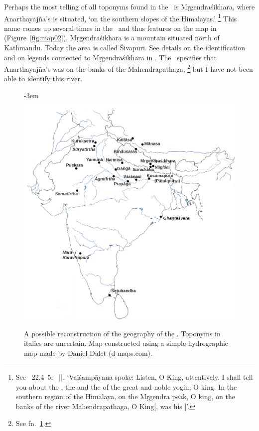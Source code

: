Perhaps the most telling of all toponyms found
in the \VSS\ is Mṛgendraśikhara,
where Anarthayajña's  is situated,
`on the southern slopes of
					the Himalayas.'%
		\footnote{\label{mrgendrasikhara}See \VSS\ 22.4--5:
     		~||.
			`Vaiśampāyana spoke: Listen, O King, attentively.
		  	I shall tell you about the , 
		  	the  and the  of the 
		  	great and noble yogin, O king.
		  	In the southern region of the Himālaya, 
		  	on the Mṛgendra peak, O king,
		  	on the banks of the river Mahendrapathaga, O King[,
		  	was his ]'.}
This name comes up
several times in the \NepMah\ and thus features on
the map in 
(Figure~\ref{fig:map02}). Mṛgendraśikhara is a mountain
situated north of Kathmandu. Today the area is
called Śivapurī. See details on the identification and
on legends connected to Mṛgendraśikhara in
. The \VSS\
specifies that Anarthayajña's  was
on the banks of the Mahendrapathaga,%
		 \footnote{See fn.~\ref{mrgendrasikhara}.}
but I have not been able to identify this river.



\begin{figure}[!]
\thispagestyle{empty}
\leftskip-3em\includegraphics[scale=.5]{simplemap.png}
\caption[Geography of the \VSS]{A possible reconstruction of the  geography of the \VSS. Toponyms in italics are uncertain. Map constructed using a simple hydrographic map made by Daniel Dalet (d-maps.com).\label{fig:map01}}
\end{figure}

